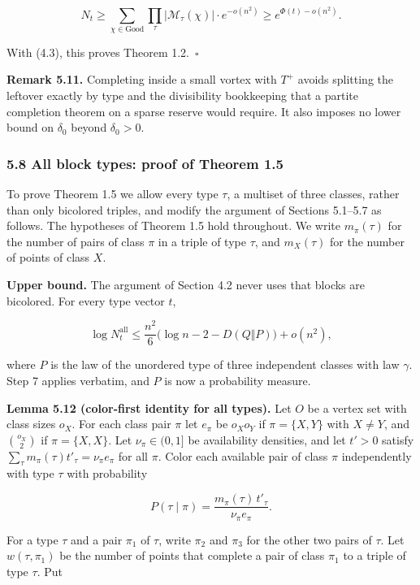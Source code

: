 \documentclass[english,11pt,a4paper]{article}
\begin{document}
\nopagebreak[4]
\[N_t\ge\sum_{\chi\in\mathrm{Good}}\prod_\tau|\mathcal M_\tau(\chi)|\cdot e^{-o(n^2)}\ge e^{\Phi(t)-o(n^2)}.\]

With (4.3), this proves Theorem 1.2.~\(\square\)

\textbf{Remark 5.11.} Completing inside a small vortex with \(T^+\) avoids splitting the leftover exactly by type and the divisibility bookkeeping that a partite completion theorem on a sparse reserve would require. It also imposes no lower bound on \(\delta_0\) beyond \(\delta_0>0\).

\subsubsection{5.8 All block types: proof of Theorem 1.5}\label{all-block-types-proof-of-theorem-1.5}

To prove Theorem 1.5 we allow every type \(\tau\), a multiset of three classes, rather than only bicolored triples, and modify the argument of Sections 5.1--5.7 as follows. The hypotheses of Theorem 1.5 hold throughout. We write \(m_\pi(\tau)\) for the number of pairs of class \(\pi\) in a triple of type \(\tau\), and \(m_X(\tau)\) for the number of points of class \(X\).

\textbf{Upper bound.} The argument of Section 4.2 never uses that blocks are bicolored. For every type vector \(t\),

\nopagebreak[4]
\[\log N^{\mathrm{all}}_t\le\frac{n^2}{6}\bigl(\log n-2-D(Q\Vert P)\bigr)+o(n^2),
\tag{5.2}\]

where \(P\) is the law of the unordered type of three independent classes with law \(\gamma\). Step 7 applies verbatim, and \(P\) is now a probability measure.

\textbf{Lemma 5.12 (color-first identity for all types).} Let \(O\) be a vertex set with class sizes \(o_X\). For each class pair \(\pi\) let \(e_\pi\) be \(o_Xo_Y\) if \(\pi=\{X,Y\}\) with \(X\ne Y\), and \(\binom{o_X}{2}\) if \(\pi=\{X,X\}\). Let \(\nu_\pi\in(0,1]\) be availability densities, and let \(t'>0\) satisfy \(\sum_\tau m_\pi(\tau)t'_\tau=\nu_\pi e_\pi\) for all \(\pi\). Color each available pair of class \(\pi\) independently with type \(\tau\) with probability

\nopagebreak[4]
\[P(\tau\mid\pi)=\frac{m_\pi(\tau)\,t'_\tau}{\nu_\pi e_\pi}.\]

For a type \(\tau\) and a pair \(\pi_1\) of \(\tau\), write \(\pi_2\) and \(\pi_3\) for the other two pairs of \(\tau\). Let \(w(\tau,\pi_1)\) be the number of points that complete a pair of class \(\pi_1\) to a triple of type \(\tau\). Put
\end{document}
